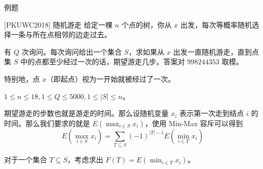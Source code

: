 \documentclass[UTF8]{beamer}
\begin{document}
    \begin{frame}{例题}
        \begin{block}{[PKUWC2018] 随机游走}
            给定一棵 $n$ 个点的树，你从 $x$ 出发，每次等概率随机选择一条与所在点相邻的边走过去。

            有 $Q$ 次询问。每次询问给出一个集合 $S$，求如果从 $x$ 出发一直随机游走，直到点集 $S$ 中的点都至少经过一次的话，期望游走几步。答案对 $998244353$ 取模。

            特别地，点 $x$（即起点）视为一开始就被经过了一次。

            $1\le n\le 18,1\le Q\le 5000,1\le |S|\le n$。
        \end{block}

        期望游走的步数也就是游走的时间。那么设随机变量 $x_i$ 表示第一次走到结点 $i$ 的时间。那么我们要求的就是 $E\left(\max_{i\in S}x_i\right)$，使用 Min-Max 容斥可以得到
        $$
        E\left(\max_{i\in S}x_i\right)
        =\sum_{T\subseteq S}(-1)^{|T|-1}E\left(\min_{i\in T}x_i\right)
        $$
        
        对于一个集合 $T\subseteq S$，考虑求出 $F(T)=E(\min_{i\in T}x_i)$。
    \end{frame}
\end{document}
